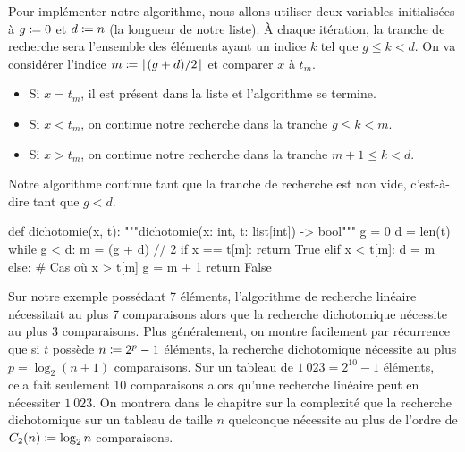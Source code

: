 \documentclass{magnoliaold}
\begin{document}
Pour implémenter notre algorithme, nous allons utiliser deux variables initialisées
à $g\coloneqq 0$ et $d\coloneqq n$ (la longueur de notre liste). À chaque itération, la tranche de recherche
 sera l'ensemble des éléments ayant un indice $k$ tel que $g\leq k<d$. On va considérer
l'indice $m \coloneqq \left\lfloor(g+d)/2\right\rfloor$ et comparer $x$ à $t_m$.
\begin{center}
\end{center}
\begin{itemize}
\item Si $x=t_m$, il est présent dans la liste et l'algorithme se termine.
\item Si $x<t_m$, on continue notre recherche dans la tranche $g\leq k < m$.
\item Si $x>t_m$, on continue notre recherche dans la tranche $m+1\leq k < d$.
\end{itemize}
Notre algorithme continue tant que la tranche de recherche est non vide, c'est-à-dire tant que $g<d$.

\begin{pythoncode}
def dichotomie(x, t):
    """dichotomie(x: int, t: list[int]) -> bool"""
    g = 0
    d = len(t)
    while g < d:
        m = (g + d) // 2
        if x == t[m]:
            return True
        elif x < t[m]:
            d = m
        else:              # Cas où x > t[m]
            g = m + 1
    return False
\end{pythoncode}
\noindent
Sur notre exemple possédant 7 éléments, l'algorithme de recherche linéaire nécessitait au plus 7 comparaisons alors
que la recherche dichotomique nécessite au plus 3 comparaisons. Plus généralement, on montre facilement
par récurrence que si $t$ possède $n\coloneqq 2^p-1$ éléments, la recherche dichotomique nécessite au plus
$p=\log_2(n+1)$ comparaisons. Sur un tableau de $1\ 023=2^{10}-1$ éléments, cela fait seulement 10 comparaisons
alors qu'une recherche linéaire peut en nécessiter $1\ 023$. On montrera dans le
chapitre sur la complexité que la recherche dichotomique
sur un tableau de taille $n$ quelconque nécessite au plus de l'ordre de $C_2(n)\coloneqq \log_2 n$ comparaisons.
\end{document}
